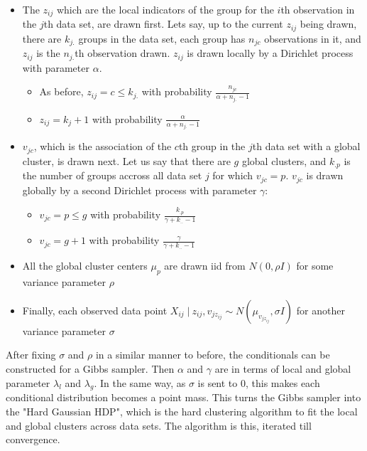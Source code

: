 \documentclass[11pt]{article}
\newcommand{\st}{ \; \big | \:}
\theoremstyle{definition}
\begin{document}
\begin{itemize}
    \item The $z_{ij}$ which are the local indicators of the group for the $i$th observation in the $j$th data set, are drawn first. Lets say, up to the current $z_{ij}$ being drawn, there are $k_{j.}$ groups in the data set, each group has $n_{jc}$ observations in it, and $z_{ij}$ is the $n_{j.}$th observation drawn. $z_{ij}$ is drawn locally by a Dirichlet process with parameter $\alpha$. 
        \begin{itemize}
            \item As before, $z_{ij}=c\leq k_{j.}$ with probability $\frac{n_{jc}}{\alpha+n_{j.}-1}$
            \item $z_{ij}=k_j+1$ with probability $\frac{\alpha}{\alpha+n_{j.}-1}$
        \end{itemize}

    \item $v_{jc}$, which is the association of the $c$th group in the $j$th data set with a global cluster, is drawn next. Let us say that there are $g$ global clusters, and $k_{.p}$ is the number of groups accross all  data set $j$ for which $v_{jc}=p$. $v_{jc}$ is drawn globally by a second Dirichlet process with parameter $\gamma$:
        \begin{itemize}
            \item $v_{jc}=p\leq g$ with probability $\frac{k_{.p}}{\gamma+k_{..}-1}$
            \item $v_{jc}=g+1$ with probability $\frac{\gamma}{\gamma+k_{..}-1}$
        \end{itemize}
    \item All the global cluster centers $\mu_p$ are drawn iid from $N(0,\rho I)$ for some variance parameter $\rho$
    \item Finally, each observed data point $X_{ij}\st z_{ij},v_{jz_{ij}} \sim N(\mu_{v_{jz_{ij}}}, \sigma I)$ for another variance parameter $\sigma$
\end{itemize}
After fixing $\sigma$ and $\rho$ in a similar manner to before, the conditionals can be constructed for a Gibbs sampler. Then $\alpha$ and $\gamma$ are in terms of local and global parameter $\lambda_l$ and $\lambda_g$. In the same way, as $\sigma$ is sent to $0$, this makes each conditional distribution becomes a point mass. This turns the Gibbs sampler into the "Hard Gaussian HDP", which is the hard clustering algorithm to fit the local and global clusters across data sets. The algorithm is this, iterated till convergence.
\end{document}
